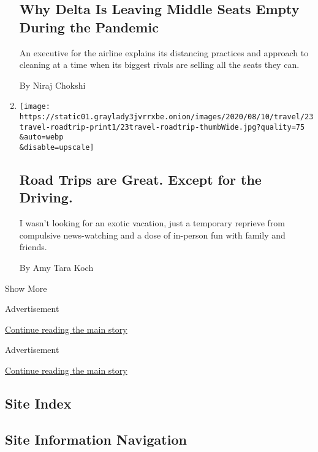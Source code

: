 \begin{enumerate}
  \hypertarget{why-delta-is-leaving-middle-seats-empty-during-the-pandemic}{%
  \subsection{Why Delta Is Leaving Middle Seats Empty During the
  Pandemic}\label{why-delta-is-leaving-middle-seats-empty-during-the-pandemic}}

  An executive for the airline explains its distancing practices and
  approach to cleaning at a time when its biggest rivals are selling all
  the seats they can.

  By Niraj Chokshi
\item
  \href{/2020/07/24/travel/virus-road-trip.html}{}

  \texttt{[image: https://static01.graylady3jvrrxbe.onion/images/2020/08/10/travel/23travel-roadtrip-print1/23travel-roadtrip-thumbWide.jpg?quality=75\\\&auto=webp\\\&disable=upscale]}

  \hypertarget{road-trips-are-great-except-for-the-driving}{%
  \subsection{Road Trips are Great. Except for the
  Driving.}\label{road-trips-are-great-except-for-the-driving}}

  I wasn't looking for an exotic vacation, just a temporary reprieve
  from compulsive news-watching and a dose of in-person fun with family
  and friends.

  By Amy Tara Koch
\end{enumerate}

Show More

Advertisement

\protect\hyperlink{after-mid2}{Continue reading the main story}

Advertisement

\protect\hyperlink{after-mktg}{Continue reading the main story}

\hypertarget{site-index}{%
\subsection{Site Index}\label{site-index}}

\hypertarget{site-information-navigation}{%
\subsection{Site Information
Navigation}\label{site-information-navigation}}

